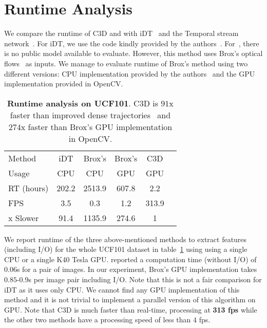 \documentclass[10pt,twocolumn,letterpaper]{article}
\begin{document}
\section{Runtime Analysis}
\label{sec:runtime}

We compare the runtime of C3D and with iDT~\cite{Wang2013} and the Temporal stream network~\cite{SimonyanZ14}. For iDT, we use the code kindly provided by the authors~\cite{Wang2013}. For~\cite{SimonyanZ14}, there is no public model available to evaluate. However, this method uses Brox's optical flows~\cite{BroxM11} as inputs. We manage to evaluate runtime of Brox's method using two different versions: CPU implementation provided by the authors~\cite{BroxM11} and the GPU implementation provided in OpenCV.

\begin{table}
\begin{center}
{\small
\begin{tabular}{|l|c|c|c|c|c|}
\hline
Method & iDT & Brox's & Brox's & C3D \\
Usage & CPU & CPU & GPU & GPU \\
\hline
RT (hours) & 202.2 & 2513.9 & 607.8 & 2.2 \\
FPS & 3.5 & 0.3 & 1.2 & 313.9 \\
x Slower & 91.4 & 1135.9 & 274.6 & 1 \\
\hline
\end{tabular}
}
\end{center}
\vspace{-8pt}
\caption{{\bf Runtime analysis on UCF101}. C3D is $91$x faster than improved dense trajectories~\cite{Wang2013} and $274$x faster than Brox's GPU implementation in OpenCV.}
\vspace{-16pt}
\label{tab:runtime}
\end{table}

We report runtime of the three above-mentioned methods to extract features (including I/O) for the whole UCF101 dataset in table~\ref{tab:runtime} using using a single CPU or a single K40 Tesla GPU. \cite{SimonyanZ14} reported a computation time (without I/O) of $0.06$s for a pair of images. In our experiment, Brox's GPU implementation takes $0.85$-$0.9$s per image pair including I/O. Note that this is not a fair comparison for iDT as it uses only CPU. We cannot find any GPU implementation of this method and it is not trivial to implement a parallel version of this algorithm on GPU. Note that C3D is much faster than real-time, processing at {\bf 313 fps} while the other two methods have a processing speed of less than $4$ fps. 
\end{document}
